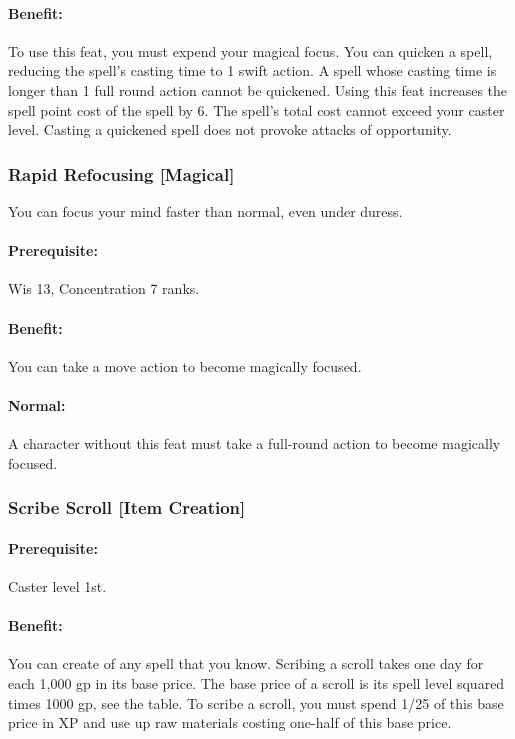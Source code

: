 \paragraph{Benefit:} To use this feat, you must expend your magical focus. 
You can quicken a spell, reducing the spell's casting time to 1 swift action. 
A spell whose casting time is longer than 1 full round action cannot be quickened.
Using this feat increases the spell point cost of the spell by 6. The spell's total cost cannot exceed your caster level.
Casting a quickened spell does not provoke attacks of opportunity.
\subsubsection[Rapid Refocusing]{Rapid Refocusing [Magical]}
\label{Feat:RapidRefocusing}
You can focus your mind faster than normal, even under duress.

\paragraph{Prerequisite:} Wis 13, Concentration 7 ranks.

\paragraph{Benefit:} You can take a move action to become magically focused.

\paragraph{Normal:} A character without this feat must take a full-round action to become magically focused.

\subsubsection[Scribe Scroll]{Scribe Scroll [Item Creation]}
\label{Feat:ScribeScroll}
\paragraph{Prerequisite:}
Caster level 1st.

\paragraph{Benefit:}
You can create  of any spell that you know. 
Scribing a scroll takes one day for each 1,000 gp in its base price. 
The base price of a scroll is its spell level squared times 1000 gp, see the  table.
To scribe a scroll, you must spend 1/25 of this base price in XP and use up raw materials costing one-half of this base price.


